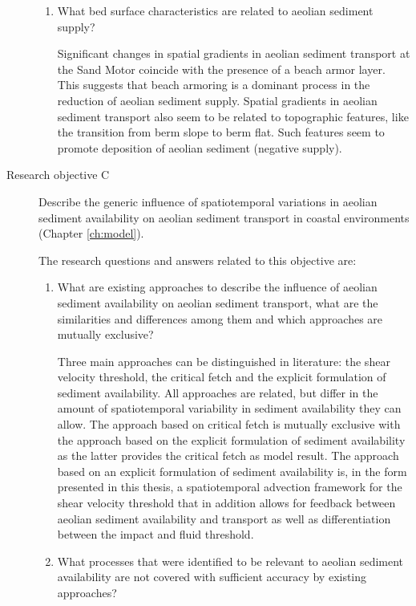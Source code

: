 \begin{description}
\begin{enumerate}[{B}1]
  \item What bed surface characteristics are related to aeolian
    sediment supply?

    Significant changes in spatial gradients in aeolian sediment
    transport at the Sand Motor coincide with the presence of a beach
    armor layer. This suggests that beach armoring is a dominant
    process in the reduction of aeolian sediment
    supply. Spatial gradients in aeolian sediment transport
    also seem to be related to topographic features, like the
    transition from berm slope to berm flat. Such features seem to
    promote deposition of aeolian sediment (negative supply).
  \end{enumerate}

\bigskip

\item[Research objective C] Describe the generic influence of
  spatiotemporal variations in aeolian sediment availability on
  aeolian sediment transport in coastal environments (Chapter
  \ref{ch:model}).

  \medskip

  The research questions and answers related to this objective are:

  \begin{enumerate}[{C}1]
  \item What are existing approaches to describe the influence of
    aeolian sediment availability on aeolian sediment transport, what
    are the similarities and differences among them and which
    approaches are mutually exclusive?

    Three main approaches can be distinguished in literature: the
    shear velocity threshold, the critical fetch and the explicit
    formulation of sediment availability. All approaches are related,
    but differ in the amount of spatiotemporal variability in sediment
    availability they can allow. The approach based on critical fetch
    is mutually exclusive with the approach based on the explicit
    formulation of sediment availability as the latter provides the
    critical fetch as model result. The approach based on an explicit
    formulation of sediment availability is, in the form presented in
    this thesis, a spatiotemporal advection framework for the shear
    velocity threshold that in addition allows for feedback between
    aeolian sediment availability and transport as well as
    differentiation between the impact and fluid threshold.

  \item What processes that were identified to be relevant to aeolian
    sediment availability are not covered with sufficient accuracy by
    existing approaches?


\end{enumerate}
\end{description}
